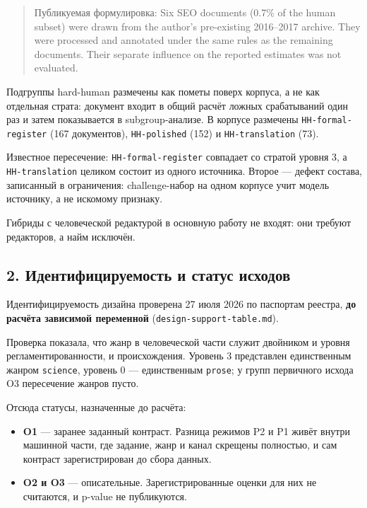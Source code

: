 \documentclass[11pt,a4paper]{article}
\renewcommand{\_}{\textunderscore\allowbreak}
\begin{document}
\begin{quote}
Публикуемая формулировка: Six SEO documents (0.7\% of the human subset) were drawn
from the author's pre-existing 2016–2017 archive. They were processed and
annotated under the same rules as the remaining documents. Their separate
influence on the reported estimates was not evaluated.
\end{quote}

Подгруппы hard-human размечены как пометы поверх корпуса, а не как отдельная
страта: документ входит в общий расчёт ложных срабатываний один раз и затем
показывается в subgroup-анализе. В корпусе размечены \texttt{HH-\allowbreak{}formal-\allowbreak{}register} (167
документов), \texttt{HH-\allowbreak{}polished} (152) и \texttt{HH-\allowbreak{}translation} (73).

Известное пересечение: \texttt{HH-\allowbreak{}formal-\allowbreak{}register} совпадает со стратой уровня 3, а
\texttt{HH-\allowbreak{}translation} целиком состоит из одного источника. Второе — дефект состава,
записанный в ограничения: challenge-набор на одном корпусе учит модель источнику,
а не искомому признаку.

Гибриды с человеческой редактурой в основную работу не входят: они требуют
редакторов, а найм исключён.

\subsection{2. Идентифицируемость и статус исходов}

Идентифицируемость дизайна проверена 27 июля 2026 по паспортам реестра, \textbf{до
расчёта зависимой переменной} (\texttt{design-\allowbreak{}support-\allowbreak{}table.md}).

Проверка показала, что жанр в человеческой части служит двойником и уровня
регламентированности, и происхождения. Уровень 3 представлен единственным жанром
\texttt{science}, уровень 0 — единственным \texttt{prose}; у групп первичного исхода O3
пересечение жанров пусто.

Отсюда статусы, назначенные до расчёта:

\begin{itemize}
\item \textbf{O1} — заранее заданный контраст. Разница режимов P2 и P1 живёт внутри машинной части, где задание, жанр и канал скрещены полностью, и сам контраст зарегистрирован до сбора данных.
\item \textbf{O2 и O3} — описательные. Зарегистрированные оценки для них не считаются, и p-value не публикуются.
\end{itemize}
\end{document}
